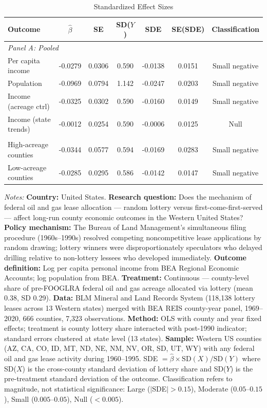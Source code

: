 \begin{table}[htbp]
\centering
\caption{Standardized Effect Sizes}
\label{tab:sde}
\begin{tabular}{lcccccc}
\hline\hline
Outcome & $\hat{\beta}$ & SE & SD($Y$) & SDE & SE(SDE) & Classification \\
\hline
\multicolumn{7}{l}{\textit{Panel A: Pooled}} \\
Per capita income & -0.0279 & 0.0306 & 0.590 & -0.0138 & 0.0151 & Small negative \\
Population & -0.0969 & 0.0794 & 1.142 & -0.0247 & 0.0203 & Small negative \\
Income (acreage ctrl) & -0.0325 & 0.0302 & 0.590 & -0.0160 & 0.0149 & Small negative \\
Income (state trends) & -0.0012 & 0.0254 & 0.590 & -0.0006 & 0.0125 & Null \\
\addlinespace
\multicolumn{7}{l}{\textit{Panel B: Heterogeneous --- by resource endowment}} \\
High-acreage counties & -0.0344 & 0.0577 & 0.594 & -0.0169 & 0.0283 & Small negative \\
Low-acreage counties & -0.0285 & 0.0295 & 0.586 & -0.0142 & 0.0147 & Small negative \\
\hline\hline
\end{tabular}
\vspace{0.5em}\begin{flushleft}\small
\textit{Notes:} \textbf{Country:} United States. \textbf{Research question:} Does the mechanism of federal oil and gas lease allocation --- random lottery versus first-come-first-served --- affect long-run county economic outcomes in the Western United States? \textbf{Policy mechanism:} The Bureau of Land Management's simultaneous filing procedure (1960s--1990s) resolved competing noncompetitive lease applications by random drawing; lottery winners were disproportionately speculators who delayed drilling relative to non-lottery lessees who developed immediately. \textbf{Outcome definition:} Log per capita personal income from BEA Regional Economic Accounts; log population from BEA. \textbf{Treatment:} Continuous --- county-level share of pre-FOOGLRA federal oil and gas acreage allocated via lottery (mean 0.38, SD 0.29). \textbf{Data:} BLM Mineral and Land Records System (118,138 lottery leases across 13 Western states) merged with BEA REIS county-year panel, 1969--2020, 666 counties, 7,323 observations. \textbf{Method:} OLS with county and year fixed effects; treatment is county lottery share interacted with post-1990 indicator; standard errors clustered at state level (13 states). \textbf{Sample:} Western US counties (AZ, CA, CO, ID, MT, ND, NE, NM, NV, OR, SD, UT, WY) with any federal oil and gas lease activity during 1960--1995. SDE $= \hat{\beta} \times \text{SD}(X) / \text{SD}(Y)$ where SD($X$) is the cross-county standard deviation of lottery share and SD($Y$) is the pre-treatment standard deviation of the outcome. Classification refers to magnitude, not statistical significance: Large ($|$SDE$| > 0.15$), Moderate ($0.05$--$0.15$), Small ($0.005$--$0.05$), Null ($< 0.005$).
\end{flushleft}
\end{table}


